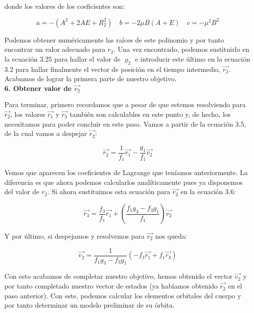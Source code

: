 \documentclass{article}
\numberwithin{equation}{section}
\begin{document}
donde los valores de los coeficientes son:

\begin{equation*}
    a = -(A^2 + 2AE + R_2^2) \quad b = -2\mu B(A + E) \quad c = -\mu^2 B^2
\end{equation*}

Podemos obtener numéricamente las raíces de este polinomio y por tanto encontrar un valor adecuado para $r_2$. Una vez encontrado, podemos sustituirlo en la ecuación 3.25 para hallar el valor de $\varrho_2$ e introducir este último en la ecuación 3.2 para hallar finalmente el vector de posición en el tiempo intermedio, $\overrightarrow{r_2}$. Acabamos de lograr la primera parte de nuestro objetivo.\\

\noindent\textbf{6. Obtener valor de $\overrightarrow{v_2}$}

Para terminar, primero recordamos que a pesar de que estemos resolviendo para $\overrightarrow{r_2}$, los valores $\overrightarrow{r_1}$ y $\overrightarrow{r_3}$ también son calculables en este punto y, de hecho, los necesitamos para poder concluir en este paso. Vamos a partir de la ecuación 3.5, de la cual vamos a despejar $\overrightarrow{r_2}$:

\begin{equation}
    \overrightarrow{r_2} = \frac{1}{f_1} \overrightarrow{r_1} - \frac{g_1}{f_1} \overrightarrow{v_2} 
\end{equation}

Vemos que aparecen los coeficientes de Lagrange que teníamos anteriormente. La diferencia es que ahora podemos calcularlos analíticamente pues ya disponemos del valor de $r_2$. Si ahora sustituimos esta ecuación para $\overrightarrow{r_2}$ en la ecuación 3.6:

\begin{equation}
    \overrightarrow{r_3} = \frac{f_3}{f_1} \overrightarrow{r_1} + \left( \frac{f_1 g_3 - f_3 g_1}{f_1} \right) \overrightarrow{v_2}
\end{equation}

Y por último, si despejamos y resolvemos para $\overrightarrow{v_2}$ nos queda:

\begin{equation}
    \overrightarrow{v_2} = \frac{1}{f_1 g_3 - f_3 g_1} (-f_3 \overrightarrow{r_1} + f_1 \overrightarrow{r_3})
\end{equation}

Con esto acabamos de completar nuestro objetivo, hemos obtenido el vector $\overrightarrow{v_2}$ y por tanto completado nuestro vector de estados (ya habíamos obtenido $\overrightarrow{r_2}$ en el paso anterior). Con este, podemos calcular los elementos orbitales del cuerpo y por tanto determinar un modelo preliminar de su órbita.\\
\end{document}
